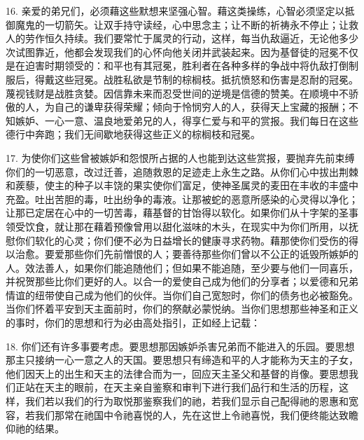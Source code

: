 16. 亲爱的弟兄们，必须藉这些默想来坚强心智。藉这类操练，心智必须坚定以抵御魔鬼的一切箭矢。让双手持守读经，心中思念主；让不断的祈祷永不停止；让救人的劳作恒久持续。我们要常忙于属灵的行动，这样，每当仇敌逼近，无论他多少次试图靠近，他都会发现我们的心怀向他关闭并武装起来。因为基督徒的冠冕不仅是在迫害时期领受的：和平也有其冠冕，胜利者在各种多样的争战中将仇敌打倒制服后，得戴这些冠冕。战胜私欲是节制的棕榈枝。抵抗愤怒和伤害是忍耐的冠冕。蔑视钱财是战胜贪婪。因信靠未来而忍受世间的逆境是信德的赞美。在顺境中不骄傲的人，为自己的谦卑获得荣耀；倾向于怜悯穷人的人，获得天上宝藏的报酬；不知嫉妒、一心一意、温良地爱弟兄的人，得享仁爱与和平的赏报。我们每日在这些德行中奔跑；我们无间歇地获得这些正义的棕榈枝和冠冕。\par

17. 为使你们这些曾被嫉妒和怨恨所占据的人也能到达这些赏报，要抛弃先前束缚你们的一切恶意，改过迁善，追随救恩的足迹走上永生之路。从你们心中拔出荆棘和蒺藜，使主的种子以丰饶的果实使你们富足，使神圣属灵的麦田在丰收的丰盛中充盈。吐出苦胆的毒，吐出纷争的毒液。让那被蛇的恶意所感染的心灵得以净化；让那已定居在心中的一切苦毒，藉基督的甘饴得以软化。如果你们从十字架的圣事领受饮食，就让那在藉着预像曾用以甜化滋味的木头，在现实中为你们所用，以抚慰你们软化的心灵；你们便不必为日益增长的健康寻求药物。藉那使你们受伤的得以治愈。要爱那些你们先前憎恨的人；要善待那些你们曾以不公正的诋毁所嫉妒的人。效法善人，如果你们能追随他们；但如果不能追随，至少要与他们一同喜乐，并祝贺那些比你们更好的人。以合一的爱使自己成为他们的分享者；以爱德和兄弟情谊的纽带使自己成为他们的伙伴。当你们自己宽恕时，你们的债务也必被豁免。当你们怀着平安到天主面前时，你们的祭献必蒙悦纳。当你们思想那些神圣和正义的事时，你们的思想和行为必由高处指引，正如经上记载：\par

18. 你们还有许多事要考虑。要思想那因嫉妒杀害兄弟而不能进入的乐园。要思想那主只接纳一心一意之人的天国。要思想只有缔造和平的人才能称为天主的子女，他们因天上的出生和天主的法律合而为一，回应天主圣父和基督的肖像。要思想我们正站在天主的眼前，在天主亲自鉴察和审判下进行我们品行和生活的历程，这样，我们若以我们的行为取悦那鉴察我们的祂，若我们显示自己配得祂的恩惠和宽容，若我们那常在祂国中令祂喜悦的人，先在这世上令祂喜悦，我们便终能达致瞻仰祂的结果。\par


